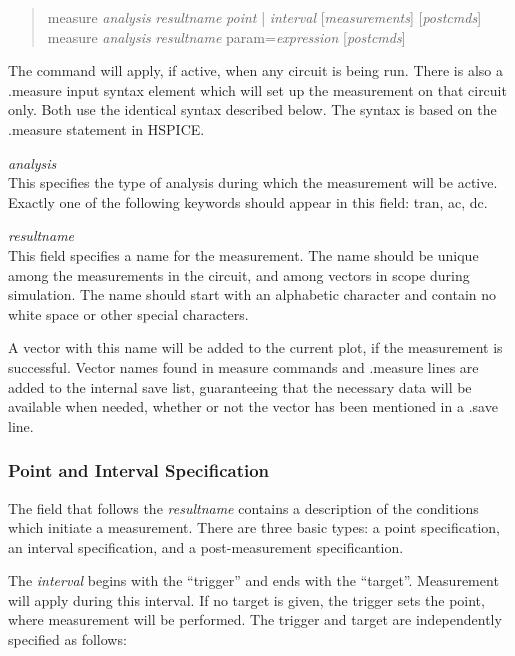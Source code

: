 \begin{quote}
measure {\it analysis} {\it resultname} {\it point} | {\it interval}
[{\it measurements\/}] [{\it postcmds\/}]\\
measure {\it analysis} {\it resultname} param={\it expression}
[{\it postcmds\/}]
\end{quote}

The command will apply, if active, when any circuit is being run. 
There is also a {\vt .measure} input syntax element which will set up
the measurement on that circuit only.  Both use the identical syntax
described below.  The syntax is based on the {\vt .measure} statement
in HSPICE.

\begin{description}
\item{\it analysis}\\
This specifies the type of analysis during which the measurement will
be active.  Exactly one of the following keywords should appear in
this field:  {\vt tran}, {\vt ac}, {\vt dc}.

\item{\it resultname}\\
This field specifies a name for the measurement.  The name should be
unique among the measurements in the circuit, and among vectors in
scope during simulation.  The name should start with an alphabetic
character and contain no white space or other special characters.
\end{description}

A vector with this name will be added to the current plot, if the
measurement is successful.  Vector names found in {\cb measure
commands} and {\vt .measure} lines are added to the internal save
list, guaranteeing that the necessary data will be available when
needed, whether or not the vector has been mentioned in a {\vt .save}
line.

\subsubsection{Point and Interval Specification}

The field that follows the {\it resultname} contains a description of
the conditions which initiate a measurement.  There are three basic
types:  a point specification, an interval specification, and a
post-measurement specificantion.

The {\it interval} begins with the ``trigger'' and ends with the
``target''.  Measurement will apply during this interval.  If no
target is given, the trigger sets the {\vt point}, where measurement
will be performed.  The trigger and target are independently specified
as follows:

